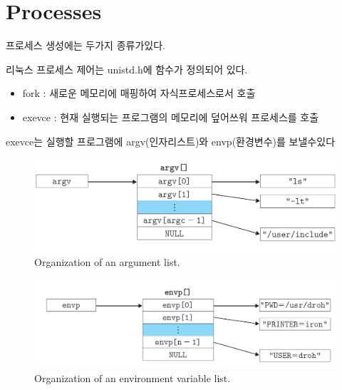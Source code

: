 \section{Processes}

프로세스 생성에는 두가지 종류가있다.

리눅스 프로세스 제어는 unistd.h에 함수가 정의되어 있다.
\begin{itemize}
    \item fork : 새로운 메모리에 매핑하여 자식프로세스로서 호출
    \item exevce : 현재 실행되는 프로그램의 메모리에 덮어쓰워 프로세스를 호출
\end{itemize}

exevce는 실행할 프로그램에 argv(인자리스트)와  envp(환경변수)를 보낼수있다

\begin{figure}[h!]
    \centering
    \includegraphics[scale=0.5]{pic/section8/pic1}
    \caption{Organization of an argument list.}
\end{figure}


\begin{figure}[h!]
    \centering
    \includegraphics[scale=0.47]{pic/section8/pic2}
    \caption{Organization of an environment variable list.}
\end{figure}

